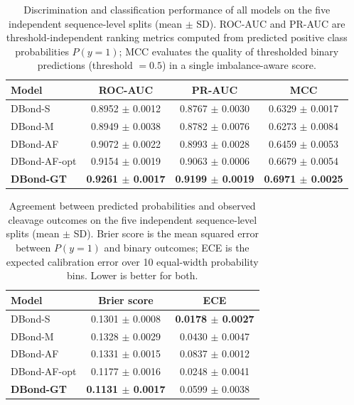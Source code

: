 \begin{table}[t]
\centering
\caption{Discrimination and classification performance of all models on the
five independent sequence-level splits (mean $\pm$ SD). ROC-AUC and PR-AUC
are threshold-independent ranking metrics computed from predicted positive
class probabilities $P(y=1)$; MCC evaluates the quality of thresholded
binary predictions (threshold $= 0.5$) in a single imbalance-aware score.}
\label{tab:discrimination}
\begin{tabular}{lccc}
\toprule
Model         & ROC-AUC              & PR-AUC               & MCC                  \\
\midrule
DBond-S       & 0.8952 $\pm$ 0.0012  & 0.8767 $\pm$ 0.0030  & 0.6329 $\pm$ 0.0017  \\
DBond-M       & 0.8949 $\pm$ 0.0038  & 0.8782 $\pm$ 0.0076  & 0.6273 $\pm$ 0.0084  \\
DBond-AF      & 0.9072 $\pm$ 0.0022  & 0.8993 $\pm$ 0.0028  & 0.6459 $\pm$ 0.0053  \\
DBond-AF-opt  & 0.9154 $\pm$ 0.0019  & 0.9063 $\pm$ 0.0006  & 0.6679 $\pm$ 0.0054  \\
\midrule
\textbf{DBond-GT} & \textbf{0.9261 $\pm$ 0.0017} & \textbf{0.9199 $\pm$ 0.0019} & \textbf{0.6971 $\pm$ 0.0025} \\
\bottomrule
\end{tabular}
\end{table}

\begin{table}[t]
\centering
\caption{Agreement between predicted probabilities and observed cleavage
outcomes on the five independent sequence-level splits (mean $\pm$ SD).
Brier score is the mean squared error between $P(y=1)$ and binary outcomes;
ECE is the expected calibration error over 10 equal-width probability bins.
Lower is better for both.}
\label{tab:calibration}
\begin{tabular}{lcc}
\toprule
Model         & Brier score          & ECE                  \\
\midrule
DBond-S       & 0.1301 $\pm$ 0.0008  & \textbf{0.0178 $\pm$ 0.0027} \\
DBond-M       & 0.1328 $\pm$ 0.0029  & 0.0430 $\pm$ 0.0047  \\
DBond-AF      & 0.1331 $\pm$ 0.0015  & 0.0837 $\pm$ 0.0012  \\
DBond-AF-opt  & 0.1177 $\pm$ 0.0016  & 0.0248 $\pm$ 0.0041  \\
\midrule
\textbf{DBond-GT} & \textbf{0.1131 $\pm$ 0.0017} & 0.0599 $\pm$ 0.0038 \\
\bottomrule
\end{tabular}
\end{table}

